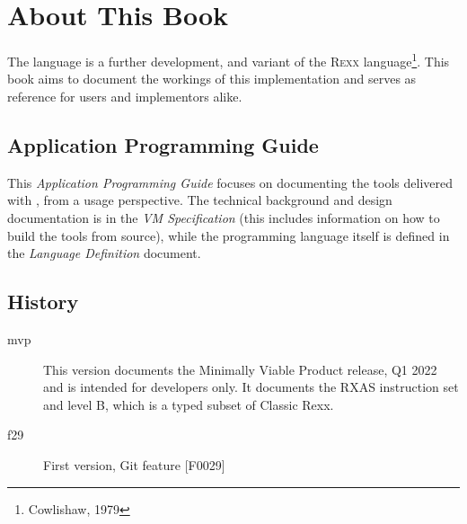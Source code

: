 \def\tightlist{}


\chapter*{About This Book}
The \crexx{} language is a further development, and variant of the
\textsc{Rexx} language\footnote{Cowlishaw, 1979}. This book aims to
document the workings of this implementation and serves as reference
for users and implementors alike.

\section{Application Programming Guide}
This \emph{Application Programming Guide} focuses on documenting the
tools delivered with \crexx{}, from a usage perspective. The technical
background and design documentation is in the \emph{\crexx{} VM
  Specification} (this includes information on how to build the tools
from source), while the programming language itself is defined in
the \emph{\crexx{} Language Definition} document.

\section*{History}

\begin{description}
\item[mvp] This version documents the Minimally Viable Product
  release, Q1 2022 and is intended for developers only. It documents
  the RXAS instruction set and \crexx{} level B, which is a typed
  subset of Classic Rexx.
\item[f29] First version, Git feature [F0029]
\end{description}


